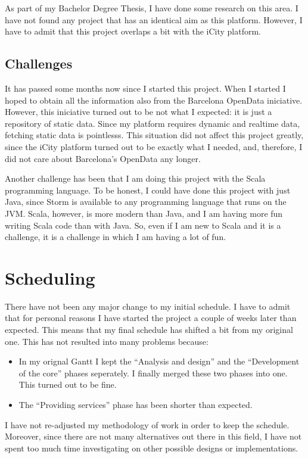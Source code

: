 \documentclass[a4paper,12pt]{article}
\newcommand{\mylist}{
\begin{itemize}
\setlength{\itemsep}{1pt}
\setlength{\parskip}{0pt}
\setlength{\parsep}{0pt}}
\newcommand{\mylistend}{\end{itemize}}
\begin{document}
As part of my Bachelor Degree Thesis, I have done some research on this area. I
have not found any project that has an identical aim as this platform. However,
I have to admit that this project overlaps a bit with the iCity platform.

\subsection{Challenges}

It has passed some months now since I started this project. When I started I
hoped to obtain all the information also from the Barcelona OpenData
iniciative. However, this iniciative turned out to be not what I expected: it
is just a repository of static data. Since my platform requires dynamic and
realtime data, fetching static data is pointlesss. This situation did not
affect this project greatly, since the iCity platform turned out to be exactly
what I needed, and, therefore, I did not care about Barcelona's OpenData any
longer.

Another challenge has been that I am doing this project with the Scala
programming language. To be honest, I could have done this project with just
Java, since Storm is available to any programming language that runs on the
JVM. Scala, however, is more modern than Java, and I am having more fun writing
Scala code than with Java. So, even if I am new to Scala and it is a challenge,
it is a challenge in which I am having a lot of fun.

\section{Scheduling}

There have not been any major change to my initial schedule. I have to admit
that for personal reasons I have started the project a couple of weeks later
than expected. This means that my final schedule has shifted a bit from my
original one. This has not resulted into many problems because:

\mylist
  \item In my orignal Gantt I kept the ``Analysis and design'' and the
``Development of the core'' phases seperately. I finally merged these two
phases into one. This turned out to be fine.
  \item The ``Providing services'' phase has been shorter than expected.
\mylistend

I have not re-adjusted my methodology of work in order to keep the schedule.
Moreover, since there are not many alternatives out there in this field, I
have not spent too much time investigating on other possible designs or
implementations.
\end{document}

